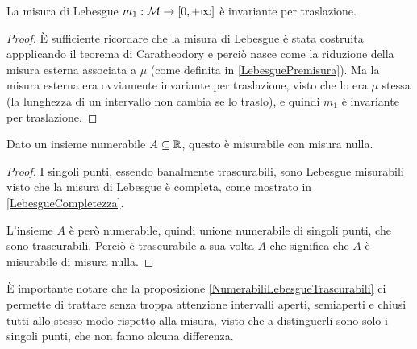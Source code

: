 \begin{remark}\label{LebesgueInvarianteTraslazione}
	La misura di Lebesgue $m_1:\mathcal M\to[0,+\infty]$ è invariante per traslazione.
\end{remark}
\begin{proof}
	È sufficiente ricordare che la misura di Lebesgue è stata costruita appplicando il teorema di Caratheodory e perciò nasce come la riduzione della misura esterna associata a $\mu$ (come definita in \cref{LebesguePremisura}). Ma la misura esterna era ovviamente invariante per traslazione, visto che lo era $\mu$ stessa (la lunghezza di un intervallo non cambia se lo traslo), e quindi $m_1$ è invariante per traslazione.
\end{proof}

\begin{proposition}\label{NumerabiliLebesgueTrascurabili}
	Dato un insieme numerabile $A\subseteq\mathbb R$, questo è misurabile con misura nulla.
\end{proposition}
\begin{proof}
	I singoli punti, essendo banalmente trascurabili, sono Lebesgue misurabili visto che la misura di Lebesgue è completa, come mostrato in \cref{LebesgueCompletezza}.
	
	L'insieme $A$ è però numerabile, quindi unione numerabile di singoli punti, che sono trascurabili. Perciò è trascurabile a sua volta $A$ che significa che $A$ è misurabile di misura nulla.
\end{proof}
\begin{remark}
	È importante notare che la proposizione \cref{NumerabiliLebesgueTrascurabili} ci permette di trattare senza troppa attenzione intervalli aperti, semiaperti e chiusi tutti allo stesso modo rispetto alla misura, visto che a distinguerli sono solo i singoli punti, che non fanno alcuna differenza.
\end{remark}




